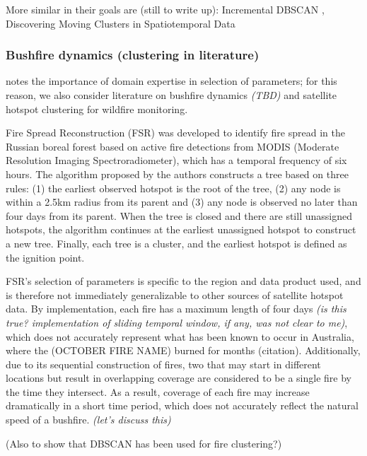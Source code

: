 More similar in their goals are (still to write up): Incremental DBSCAN
\citep{ester1998incremental}, Discovering Moving Clusters in
Spatiotemporal Data \citep{Kalnis2005}

\hypertarget{bushfire-dynamics-clustering-in-literature}{%
\subsubsection{Bushfire dynamics (clustering in
literature)}\label{bushfire-dynamics-clustering-in-literature}}

\citet{kisilevich2009spatio} notes the importance of domain expertise in
selection of parameters; for this reason, we also consider literature on
bushfire dynamics \emph{(TBD)} and satellite hotspot clustering for
wildfire monitoring.

Fire Spread Reconstruction (FSR) \citep{Loboda2007} was developed to
identify fire spread in the Russian boreal forest based on active fire
detections from MODIS (Moderate Resolution Imaging Spectroradiometer),
which has a temporal frequency of six hours. The algorithm proposed by
the authors constructs a tree based on three rules: (1) the earliest
observed hotspot is the root of the tree, (2) any node is within a 2.5km
radius from its parent and (3) any node is observed no later than four
days from its parent. When the tree is closed and there are still
unassigned hotspots, the algorithm continues at the earliest unassigned
hotspot to construct a new tree. Finally, each tree is a cluster, and
the earliest hotspot is defined as the ignition point.

FSR's selection of parameters is specific to the region and data product
used, and is therefore not immediately generalizable to other sources of
satellite hotspot data. By implementation, each fire has a maximum
length of four days \emph{(is this true? implementation of sliding
temporal window, if any, was not clear to me)}, which does not
accurately represent what has been known to occur in Australia, where
the (OCTOBER FIRE NAME) burned for months (citation). Additionally, due
to its sequential construction of fires, two that may start in different
locations but result in overlapping coverage are considered to be a
single fire by the time they intersect. As a result, coverage of each
fire may increase dramatically in a short time period, which does not
accurately reflect the natural speed of a bushfire. \emph{(let's discuss
this)}

(Also \citep{hermawati2016} to show that DBSCAN has been used for fire
clustering?)

